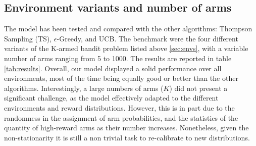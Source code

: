 \subsection{Environment variants and number of arms}

The model has been tested and compared with the other algorithms: Thompson Sampling (TS), $\epsilon$-Greedy, and UCB. The benchmark were the four different variants of the K-armed bandit problem listed above \ref{sec:envs}, with a variable number of arms ranging from 5 to 1000.
The results are reported in table \ref{tab:results}.
Overall, our model displayed a solid performance over all environments, most of the time being equally good or better than the other algorithms.
Interestingly, a large numbers of arms ($K$) did not present a significant challenge, as the model effectively adapted to the different environments and reward distributions.
However, this is in part due to the randomness in the assignment of arm probabilities, and the statistics of the quantity of high-reward arms as their number increases. Nonetheless, given the non-stationarity it is still a non trivial task to re-calibrate to new distributions.


